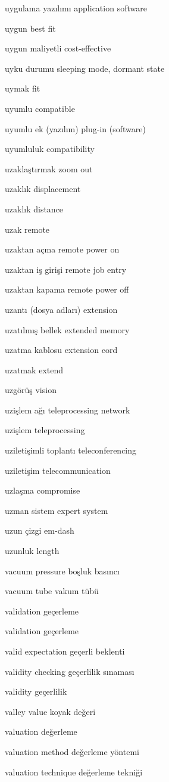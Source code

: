 \documentclass[12pt,fleqn]{article}\usepackage{../../common}
\begin{document}
uygulama yazılımı application software

uygun best fit

uygun maliyetli cost-effective

uyku durumu sleeping mode, dormant state

uymak fit

uyumlu compatible

uyumlu ek (yazılım) plug-in (software)

uyumluluk compatibility

uzaklaştırmak zoom out

uzaklık displacement

uzaklık distance

uzak remote

uzaktan açma remote power on

uzaktan iş girişi remote job entry

uzaktan kapama remote power off

uzantı (dosya adları) extension

uzatılmış bellek extended memory

uzatma kablosu extension cord

uzatmak extend

uzgörüş vision

uzişlem ağı teleprocessing network

uzişlem teleprocessing

uziletişimli toplantı teleconferencing

uziletişim telecommunication

uzlaşma compromise

uzman sistem expert system

uzun çizgi em-dash

uzunluk length

vacuum pressure boşluk basıncı

vacuum tube vakum tübü

validation geçerleme

validation geçerleme

valid expectation geçerli beklenti

validity checking geçerlilik sınaması

validity geçerlilik

valley value koyak değeri

valuation değerleme

valuation method değerleme yöntemi

valuation technique değerleme tekniği
\end{document}
